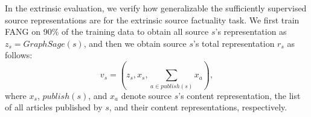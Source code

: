 \documentclass[sigconf,anonymous]{acmart}
\theoremstyle{definition}
\theoremstyle{hypothesis}
\begin{document}
In the extrinsic evaluation, we verify how generalizable the sufficiently supervised source representations are for the extrinsic source factuality task. We first train FANG on 90\% of the training data to obtain all source $s$'s representation as $z_s=GraphSage(s)$, and then we obtain source $s$'s total representation $r_s$ as follows: 
\begin{equation}
    v_s=(z_s,x_s,\sum_{a\in publish(s)}x_a), 
\end{equation}
where $x_s$, $publish(s)$, and $x_a$ denote source $s$'s content representation, the list of all articles published by $s$, 
and  their content representations, respectively. 

\begin{figure}[t]
\centering
{}
\\

\end{figure}
\end{document}
